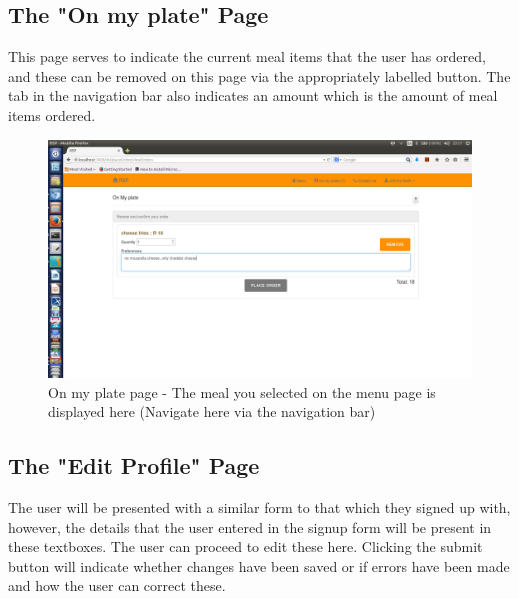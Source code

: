 \documentclass[a4paper,12pt]{article}
\begin{document}
\subsection{The "On my plate" Page} 
This page serves to indicate the current meal items that the user has ordered, and these can be removed on this page via the appropriately labelled button. The tab in the navigation bar also indicates an amount which is the amount of meal items ordered.

\begin{figure}[H]
  \centering
    \includegraphics[width=1.0\textwidth]{screenshots/addedOnPlate.png}
    \caption{On my plate page - The meal you selected on the menu page is displayed here (Navigate here via the navigation bar)} 
\end{figure}

\subsection{The "Edit Profile" Page} 
The user will be presented with a similar form to that which they signed up with, however, the details that the user entered in the signup form will be present in these textboxes. The user can proceed to edit these here. Clicking the submit button will indicate whether changes have been saved or if errors have been made and how the user can correct these.
\end{document}
